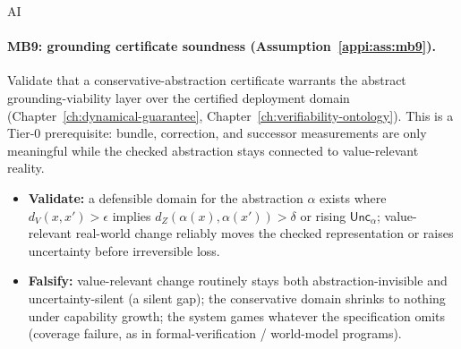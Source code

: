 \begin{authbar}{AI}
\paragraph{MB9: grounding certificate soundness (Assumption~\ref{appi:ass:mb9}).}
Validate that a conservative-abstraction certificate warrants the abstract grounding-viability layer over the certified deployment domain (Chapter~\ref{ch:dynamical-guarantee}, Chapter~\ref{ch:verifiability-ontology}). This is a Tier-0 prerequisite: bundle, correction, and successor measurements are only meaningful while the checked abstraction stays connected to value-relevant reality.
\begin{itemize}[nosep]
  \item \textbf{Validate:} a defensible domain for the abstraction \(\alpha\) exists where \(d_V(x,x')>\epsilon\) implies \(d_Z(\alpha(x),\alpha(x'))>\delta\) or rising \(\mathsf{Unc}_{\alpha}\); value-relevant real-world change reliably moves the checked representation or raises uncertainty before irreversible loss.
  \item \textbf{Falsify:} value-relevant change routinely stays both abstraction-invisible and uncertainty-silent (a silent gap); the conservative domain shrinks to nothing under capability growth; the system games whatever the specification omits (coverage failure, as in formal-verification / world-model programs).
\end{itemize}


\end{authbar}
